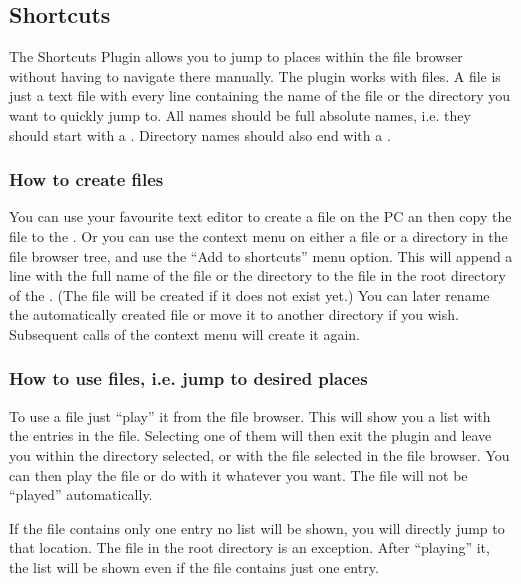 \subsection{Shortcuts}
\label{ref:Shortcutsplugin}

The Shortcuts Plugin allows you to jump to places within the file browser
without having to navigate there manually. The plugin works with
 files. A  file is just a text file with every
line containing the name of the file or the directory you want to quickly
jump to. All names should be full absolute names, i.e. they should start
with a \fname{/}. Directory names should also end with a \fname{/}.


\subsubsection{How to create  files}

You can use your favourite text editor to create a  file on the
PC an then copy the file to the \dap{}. Or you can use the context menu on
either a file or a directory in the file browser tree, and use the ``Add to
shortcuts'' menu option. This will append a line with the full name of the
file or the directory to the  file in the root
directory of the \dap{}. (The file will be created if it does not exist
yet.) You can later rename the automatically created 
file or move it to another directory if you wish. Subsequent calls of the
context menu will create it again.


\subsubsection{How to use  files, i.e. jump to desired places}

To use a  file just ``play'' it from the file browser. This will
show you a list with the entries in the file. Selecting one of them will
then exit the plugin and leave you within the directory selected, or with
the file selected in the file browser. You can then play the file or do
with it whatever you want. The file will not be ``played'' automatically.

If the  file contains only one entry no list will be shown, you
will directly jump to that location. The file  in the
root directory is an exception. After ``playing'' it, the list will be shown
even if the file contains just one entry.

